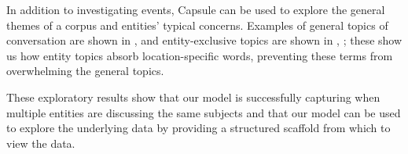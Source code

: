 In addition to investigating events, Capsule can be used to explore the general themes of a corpus and entities' typical concerns.  Examples of general topics of conversation are shown in ,  and entity-exclusive topics are shown in , ; these show us how entity topics absorb location-specific words, preventing these terms from overwhelming the general topics.

These exploratory results show that our model is successfully capturing when multiple entities are discussing the same subjects and that our model can be used to explore the underlying data by providing a structured scaffold from which to view the data.
